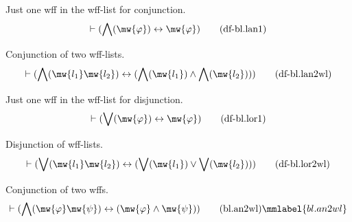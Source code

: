 \begin{metadefinition} Just one wff in the wff-list for
conjunction.
\begin{align}
\vdash ( \bigwedge( \mw{\varphi} ) \leftrightarrow \mw{\varphi}
    )\label{eq:df-bl.lan1}\tag{df-bl.lan1}
\end{align}
\end{metadefinition}


\begin{metadefinition} Conjunction of two wff-lists.
\begin{align}
\vdash ( \bigwedge( \mw{l_1} \mw{l_2} ) \leftrightarrow ( \bigwedge( \mw{l_1} )
    \wedge \bigwedge( \mw{l_2} ) ) )\label{eq:df-bl.lan2wl}\tag{df-bl.lan2wl}
\end{align}
\end{metadefinition}


\begin{metadefinition} Just one wff in the wff-list for
disjunction.
\begin{align}
\vdash ( \bigvee( \mw{\varphi} ) \leftrightarrow \mw{\varphi}
    )\label{eq:df-bl.lor1}\tag{df-bl.lor1}
\end{align}
\end{metadefinition}


\begin{metadefinition} Disjunction of wff-lists.
\begin{align}
\vdash ( \bigvee( \mw{l_1} \mw{l_2} ) \leftrightarrow ( \bigvee( \mw{l_1} )
    \vee \bigvee( \mw{l_2} ) ) )\label{eq:df-bl.lor2wl}\tag{df-bl.lor2wl}
\end{align}
\end{metadefinition}


\begin{lemma} Conjunction of two wffs.
\begin{align}
\vdash ( \bigwedge( \mw{\varphi} \mw{\psi} ) \leftrightarrow ( \mw{\varphi} \wedge \mw{\psi} )
    )%
    \tag{bl.an2wl}\mmlabel{bl.an2wl}
\end{align}
\end{lemma}

